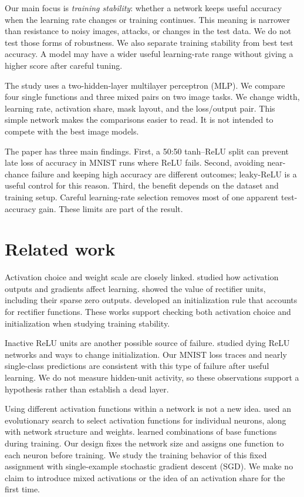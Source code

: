 \documentclass[10pt]{article}
\begin{document}
Our main focus is \emph{training stability}: whether a network keeps useful accuracy when the learning rate changes or training continues. This meaning is narrower than resistance to noisy images, attacks, or changes in the test data. We do not test those forms of robustness. We also separate training stability from best test accuracy. A model may have a wider useful learning-rate range without giving a higher score after careful tuning.

The study uses a two-hidden-layer multilayer perceptron (MLP). We compare four single functions and three mixed pairs on two image tasks. We change width, learning rate, activation share, mask layout, and the loss/output pair. This simple network makes the comparisons easier to read. It is not intended to compete with the best image models.

The paper has three main findings. First, a 50:50 tanh--ReLU split can prevent late loss of accuracy in MNIST runs where ReLU fails. Second, avoiding near-chance failure and keeping high accuracy are different outcomes; leaky-ReLU is a useful control for this reason. Third, the benefit depends on the dataset and training setup. Careful learning-rate selection removes most of one apparent test-accuracy gain. These limits are part of the result.

\section{Related work}
Activation choice and weight scale are closely linked. \citet{glorot2010} studied how activation outputs and gradients affect learning. \citet{glorot2011} showed the value of rectifier units, including their sparse zero outputs. \citet{he2015} developed an initialization rule that accounts for rectifier functions. These works support checking both activation choice and initialization when studying training stability.

Inactive ReLU units are another possible source of failure. \citet{lu2019} studied dying ReLU networks and ways to change initialization. Our MNIST loss traces and nearly single-class predictions are consistent with this type of failure after useful learning. We do not measure hidden-unit activity, so these observations support a hypothesis rather than establish a dead layer.

Using different activation functions within a network is not a new idea. \citet{hagg2017} used an evolutionary search to select activation functions for individual neurons, along with network structure and weights. \citet{manessi2018} learned combinations of base functions during training. Our design fixes the network size and assigns one function to each neuron before training. We study the training behavior of this fixed assignment with single-example stochastic gradient descent (SGD). We make no claim to introduce mixed activations or the idea of an activation share for the first time.
\end{document}
